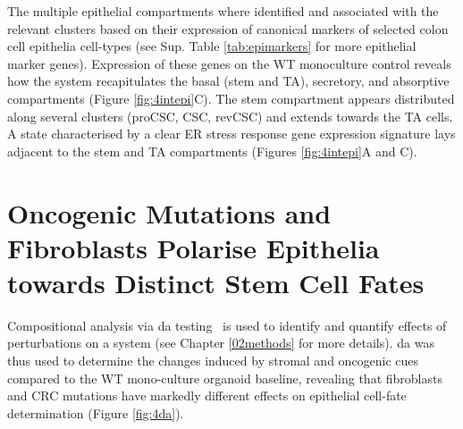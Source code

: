 The multiple epithelial compartments where identified and associated with the relevant clusters based on their expression of canonical markers of selected colon cell epithelia cell-types (see Sup. Table \ref{tab:epimarkers} for more epithelial marker genes). Expression of these genes on the WT monoculture control reveals how the system recapitulates the basal (stem and TA), secretory, and absorptive compartments (Figure \ref{fig:4intepi}C). The stem compartment appears distributed along several clusters (proCSC, CSC, revCSC) and extends towards the TA cells. A state characterised by a clear ER stress response gene expression signature lays adjacent to the stem and TA compartments (Figures \ref{fig:4intepi}A and C).

\newpage
\section{Oncogenic Mutations and Fibroblasts Polarise Epithelia towards Distinct Stem Cell Fates}

Compositional analysis via \acrfull{da} testing~\cite{dann_differential_2022} is used to identify and quantify effects of perturbations on a system (see Chapter \ref{02methods} for more details). \acrshort{da} was thus used to determine the changes induced by stromal and oncogenic cues compared to the WT mono-culture organoid baseline, revealing that fibroblasts and CRC mutations have markedly different effects on epithelial cell-fate determination (Figure \ref{fig:4da}). 

